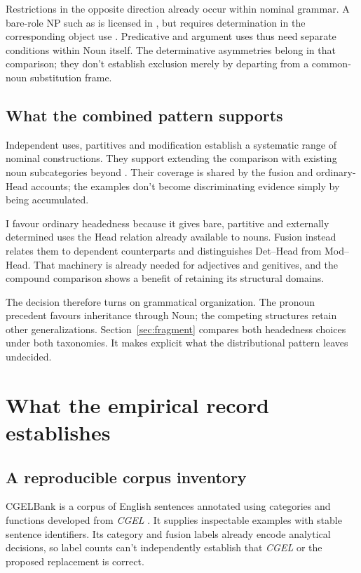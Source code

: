 \documentclass[12pt]{article}
\begin{document}
Restrictions in the opposite direction already occur within nominal grammar. A bare-role NP such as  is licensed in , but requires determination in the corresponding object use  \citep[328]{huddleston2002}. Predicative and argument uses thus need separate conditions within Noun itself. The determinative asymmetries belong in that comparison; they don't establish exclusion merely by departing from a common-noun substitution frame.

\subsection{What the combined pattern supports}\label{sec:cumulative}

Independent uses, partitives and modification establish a systematic range of nominal constructions. They support extending the comparison with existing noun subcategories beyond . Their coverage is shared by the fusion and ordinary-Head accounts; the examples don't become discriminating evidence simply by being accumulated.

I favour ordinary headedness because it gives bare, partitive and externally determined uses the Head relation already available to nouns. Fusion instead relates them to dependent counterparts and distinguishes Det--Head from Mod--Head. That machinery is already needed for adjectives and genitives, and the compound comparison shows a benefit of retaining its structural domains.

The decision therefore turns on grammatical organization. The pronoun precedent favours inheritance through Noun; the competing structures retain other generalizations. Section~\ref{sec:fragment} compares both headedness choices under both taxonomies. It makes explicit what the distributional pattern leaves undecided.

\section{What the empirical record establishes}\label{sec:empirical}

\subsection{A reproducible corpus inventory}

CGELBank is a corpus of English sentences annotated using categories and functions developed from \textit{CGEL} \citep{reynolds2023unified}. It supplies inspectable examples with stable sentence identifiers. Its category and fusion labels already encode analytical decisions, so label counts can't independently establish that \textit{CGEL} or the proposed replacement is correct.
\end{document}

